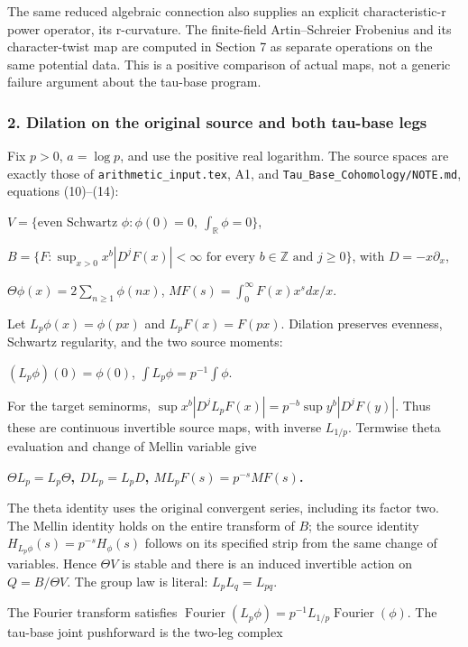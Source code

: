 The same reduced algebraic connection also supplies an explicit characteristic-r power operator, its r-curvature. The finite-field Artin--Schreier Frobenius and its character-twist map are computed in Section 7 as separate operations on the same potential data. This is a positive comparison of actual maps, not a generic failure argument about the tau-base program.

\subsubsection{2. Dilation on the original source and both tau-base legs}\label{endpoint-f1_scaling--dilation-on-the-original-source-and-both-tau-base-legs}

Fix \(p>0\), \(a=\log p\), and use the positive real logarithm. The source spaces are exactly those of \nolinkurl{arithmetic_input.tex}, A1, and \nolinkurl{Tau_Base_Cohomology/NOTE.md}, equations (10)--(14):

\(V=\{\text{even Schwartz }\phi:\phi(0)=0,\ \int_{\mathbb R}\phi=0\}\),

\(B=\{F:\sup_{x>0}x^b|D^jF(x)|<\infty\text{ for every }b\in\mathbb Z\text{ and }j\ge 0\}\), with \(D=-x \partial_x\),

\(\Theta \phi(x)=2 \sum_{n\ge 1}\phi(nx)\), \(MF(s)=\int_0^\infty F(x)x^s dx/x\).

Let \(L_p \phi(x)=\phi(px)\) and \(L_p F(x)=F(px)\). Dilation preserves evenness, Schwartz regularity, and the two source moments:

\((L_p \phi)(0)=\phi(0)\), \(\int L_p \phi=p^{-1} \int \phi\).

For the target seminorms, \(\sup x^b|D^j L_pF(x)|=p^{-b}\sup y^b|D^jF(y)|\). Thus these are continuous invertible source maps, with inverse \(L_{1/p}\). Termwise theta evaluation and change of Mellin variable give

\textbf{\(\Theta L_p=L_p \Theta\), \(D L_p=L_pD\), \(M L_pF(s)=p^{-s}MF(s)\).}

The theta identity uses the original convergent series, including its factor two. The Mellin identity holds on the entire transform of \(B\); the source identity \(H_{L_p \phi}(s)=p^{-s}H_\phi(s)\) follows on its specified strip from the same change of variables. Hence \(\Theta V\) is stable and there is an induced invertible action on \(Q=B/\Theta V\). The group law is literal: \(L_p L_q=L_{pq}\).

The Fourier transform satisfies \(\operatorname{Fourier}(L_p \phi)=p^{-1}L_{1/p} \operatorname{Fourier}(\phi)\). The tau-base joint pushforward is the two-leg complex

